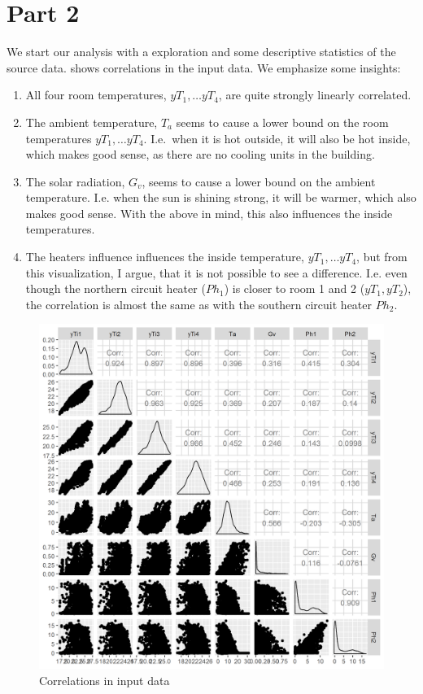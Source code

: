 \documentclass[a4paper]{article}
\begin{document}
\section{Part 2}

We start our analysis with a exploration and some descriptive statistics of the source data.  shows correlations in the input data. We emphasize some insights:

\begin{enumerate}
    \item All four room temperatures, $yT_1, \ldots yT_4$, are quite strongly linearly correlated.
    \item The ambient temperature, $T_a$ seems to cause a lower bound on the room temperatures $yT_1, \ldots yT_4$. I.e.\ when it is hot outside, it will also be hot inside, which makes good sense, as there are no cooling units in the building.
    \item The solar radiation, $G_v$, seems to cause a lower bound on the ambient temperature. I.e. when the sun is shining strong, it will be warmer, which also makes good sense. With the above in mind, this also influences the inside temperatures.
    \item The heaters influence influences the inside temperature, $yT_1, \ldots yT_4$, but from this visualization, I argue, that it is not possible to see a difference. I.e. even though the northern circuit heater ($Ph_1$) is closer to room 1 and 2 ($yT_1, yT_2$), the correlation is almost the same as with the southern circuit heater $Ph_2$. 
\end{enumerate}

\begin{figure}[b!]
    \centering
    \includegraphics[width=.9\textwidth]{part2a-corr.png}
    \caption{Correlations in input data}
    \label{fig:part2a-corr}
\end{figure}
\clearpage
\end{document}

